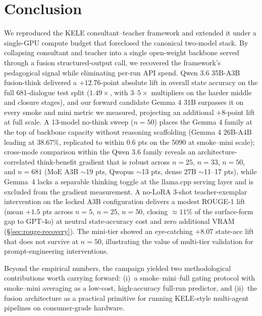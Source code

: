 \documentclass[11pt]{article}
\begin{document}
\section{Conclusion}

We reproduced the KELE consultant--teacher framework and extended it under a single-GPU compute budget that foreclosed the canonical two-model stack. By collapsing consultant and teacher into a single open-weight backbone served through a fusion structured-output call, we recovered the framework's pedagogical signal while eliminating per-run API spend. Qwen 3.6 35B-A3B fusion-think delivered a $+12.76$-point absolute lift in overall state accuracy on the full 681-dialogue test split ($1.49\times$, with $3$--$5\times$ multipliers on the harder middle and closure stages), and our forward candidate Gemma 4 31B surpasses it on every smoke and mini metric we measured, projecting an additional $+8$-point lift at full scale. A 13-model no-think sweep ($n{=}50$) places the Gemma 4 family at the top of backbone capacity without reasoning scaffolding (Gemma 4 26B-A4B leading at 38.67\%, replicated to within $0.6$ pts on the 5090 at smoke--mini scale); cross-mode comparison within the Qwen 3.6 family reveals an architecture-correlated think-benefit gradient that is robust across $n{=}25$, $n{=}33$, $n{=}50$, and $n{=}681$ (MoE A3B $\sim$19 pts, Qwopus $\sim$13 pts, dense 27B $\sim$11--17 pts), while Gemma~4 lacks a separable thinking toggle at the llama.cpp serving layer and is excluded from the gradient measurement. A no-LoRA 3-shot teacher-exemplar intervention on the locked A3B configuration delivers a modest ROUGE-1 lift (mean $+1.5$ pts across $n{=}5$, $n{=}25$, $n{=}50$, closing $\approx 11\%$ of the surface-form gap to GPT-4o) at neutral state-accuracy cost and zero additional VRAM (\S\ref{sec:rouge-recovery}). The mini-tier showed an eye-catching $+8.07$ state-acc lift that does not survive at $n{=}50$, illustrating the value of multi-tier validation for prompt-engineering interventions.

Beyond the empirical numbers, the campaign yielded two methodological contributions worth carrying forward: (i)~a smoke--mini--full gating protocol with smoke--mini averaging as a low-cost, high-accuracy full-run predictor, and (ii)~the fusion architecture as a practical primitive for running KELE-style multi-agent pipelines on consumer-grade hardware.
\end{document}
